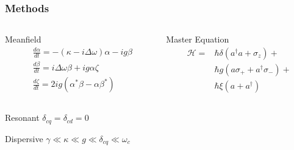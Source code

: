 \documentclass{beamer}
\begin{document}
\begin{frame}
    \frametitle{Methods}
    \begin{columns}[T]
        \begin{column}{0.5\linewidth}
            \begin{block}{Meanfield}
\begin{align}
&\frac{d \alpha}{dt} = -(\kappa -i \Delta \omega) \alpha-ig \beta\\ 
&\frac{d \beta}{dt} = i \Delta \omega \beta +ig \alpha \zeta\\ 
&\frac{d \zeta}{dt} = 2 i g(\alpha^* \beta -\alpha \beta^*)
\end{align}
            \end{block}
        \end{column}
        \begin{column}{0.5\linewidth}
            \begin{block}{Master Equation}
\begin{align} 
    \mathscr{H} = &\hbar \delta (a^\dagger a + 
    \sigma_z) + \\ \nonumber
    &\hbar g ( a \sigma_+ + a^\dagger \sigma_- ) + \\ \nonumber
    &\hbar \xi (a + a^\dagger) 
\end{align}
            \end{block}
        \end{column}
    \end{columns}
\end{frame}
\begin{frame}
    \begin{block}{Resonant}
        $
        \delta_{cq} = \delta_{cd}=0
        $
    \end{block}
\end{frame}
\begin{frame}
    
\end{frame}
\begin{frame}
    \begin{block}{Dispersive}
        $
        \gamma \ll \kappa \ll g \ll \delta_{cq} \ll \omega_c
        $
    \end{block}
\end{frame}
\end{document}
